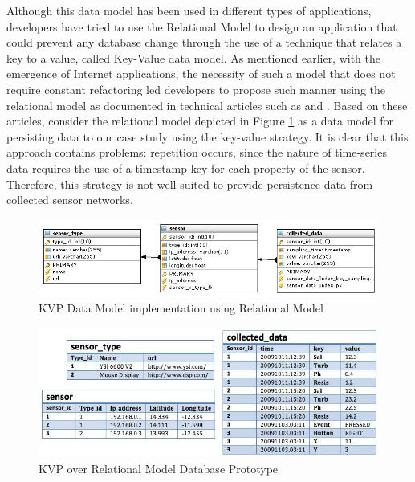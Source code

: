 Although this data model has been used in different types of applications,
developers have tried to use the Relational Model to design an application that
could prevent any database change through the use of a technique that relates a
key to a value, called Key-Value data model. As mentioned earlier, with the
emergence of Internet applications, the necessity of such a model that does
not require constant refactoring led developers to propose such manner using
the relational model as documented in technical articles such as
\cite{db-kvp-in-relational01} and \cite{db-kvp-in-relational02}. Based on
these articles, consider the relational model depicted in Figure
\ref{fig:KVP-on-Relational-Model} as a data model for persisting data to our
case study using the key-value strategy. It is clear that this approach
contains problems: repetition occurs, since the nature of
time-series data requires the use of a timestamp key for each property of the sensor. Therefore, this strategy is not
well-suited to provide persistence data from collected sensor networks.

\begin{figure}[!h]
  \centering
  \includegraphics[scale=0.6]{../diagrams/KVP-on-Relational-Model}
  \caption{KVP Data Model implementation using Relational Model}
  \label{fig:KVP-on-Relational-Model}
\end{figure}

\begin{figure}[!h]
  \centering
  \includegraphics[scale=0.75]{../diagrams/persistence-example-relational-kvp}
  \caption{KVP over Relational Model Database Prototype}
  \label{fig:persistence-example-relational-kvp}
\end{figure}

